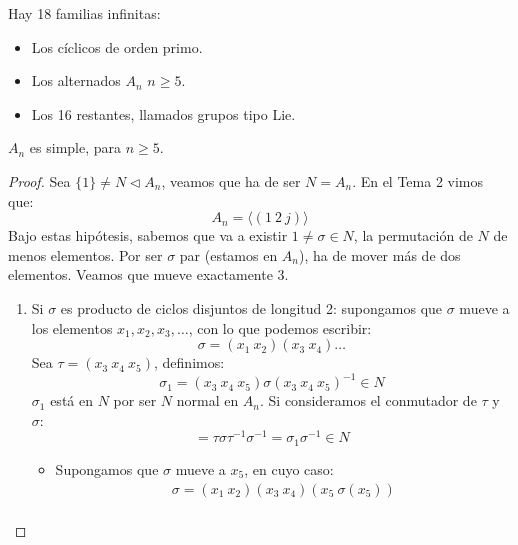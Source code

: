 Hay 18 familias infinitas:
\begin{itemize}
    \item Los cíclicos de orden primo.
    \item Los alternados $A_n$ $n\geq 5$.
    \item Los 16 restantes, llamados grupos tipo Lie.
\end{itemize}

\begin{teo}[de Abel]
    $A_n$ es simple, para $n\geq 5$.
    \begin{proof}
        Sea $\{1\} \neq N \lhd A_n$, veamos que ha de ser $N = A_n$. En el Tema 2 vimos que:
        \begin{equation*}
            A_n = \langle (1\ 2\ j) \rangle 
        \end{equation*}
        Bajo estas hipótesis, sabemos que va a existir $1\neq \sigma\in N$, la permutación de $N$ de menos elementos. Por ser $\sigma$ par (estamos en $A_n$), ha de mover más de dos elementos. Veamos que mueve exactamente 3.
        \begin{enumerate}
            \item Si $\sigma$ es producto de ciclos disjuntos de longitud 2: supongamos que $\sigma$ mueve a los elementos $x_1,x_2,x_3,\ldots$, con lo que podemos escribir:
                \begin{equation*}
                    \sigma = (x_1\ x_2)(x_3\ x_4) \ldots
                \end{equation*}
                Sea $\tau = (x_3\ x_4\ x_5)$, definimos:
                \begin{equation*}
                    \sigma_1 = (x_3\ x_4\ x_5)\sigma {(x_3\ x_4\ x_5)}^{-1}\in  N
                \end{equation*}
                $\sigma_1$ está en $N$ por ser $N$ normal en $A_n$. Si consideramos el conmutador de $\tau$ y $\sigma$:
                \begin{equation*}
                    [\tau, \sigma] = \tau \sigma \tau^{-1} \sigma^{-1} = \sigma_1 \sigma^{-1} \in N
                \end{equation*}
                \begin{itemize}
                    \item Supongamos que $\sigma$ mueve a $x_5$, en cuyo caso:
                        \begin{gather*}
                            \sigma = (x_1\ x_2)(x_3\ x_4)(x_5\ \sigma(x_5)) \\

\end{gather*}
\end{itemize}
\end{enumerate}
\end{proof}
\end{teo}
